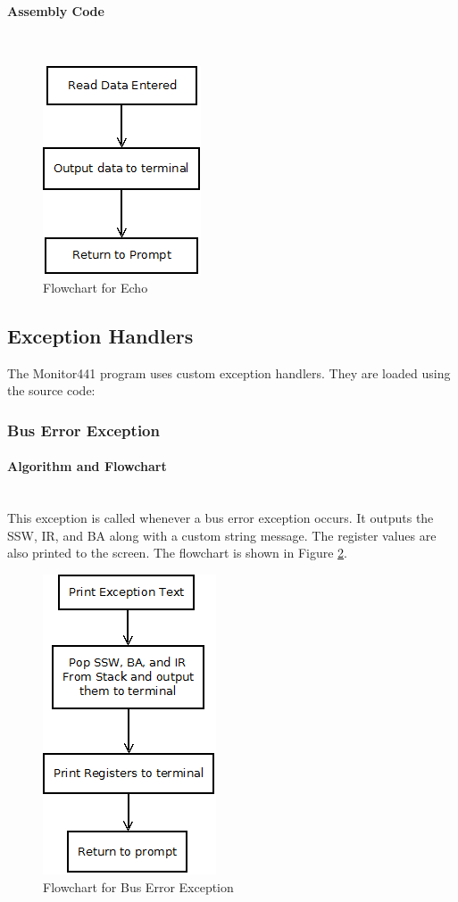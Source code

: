 \documentclass[12pt]{article}
\begin{document}
			\paragraph{Assembly Code}~\\				
		
			
\begin{figure}[H]
\centering
\includegraphics[width=0.3\linewidth]{Echo}
\caption{Flowchart for Echo}
\label{fig:Echo}
\end{figure}
			
			\subsection{Exception Handlers}
			The Monitor441 program uses custom exception handlers. They are loaded using the source code:
			
			\subsubsection{Bus Error Exception}
			\paragraph{Algorithm and Flowchart}~\\
			
			This exception is called whenever a bus error exception occurs. It outputs the SSW, IR, and BA along with a custom string message. The register values are also printed to the screen. The flowchart is shown in Figure \ref{fig:BERR}.
			
			
\begin{figure}[H]
\centering
\includegraphics[width=0.3\linewidth]{BERR}
\caption{Flowchart for Bus Error Exception}
\label{fig:BERR}
\end{figure}
\end{document}
